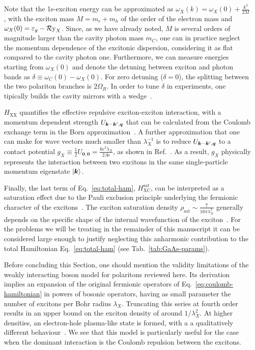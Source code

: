 Note that the 1s-exciton energy can be approximated as
$\omega_X(k) = \omega_X(0) + \frac{k^2}{2M}$, with the exciton mass
$M = m_e + m_h$ of the order of the electron mass and
$\omega_X(0) = \varepsilon_g - \operatorname{\mathcal{R}y}_X$. Since, as we have already
noted, $M$ is several orders of magnitude larger than the cavity
photon mass $m_{C}$, one can in practice neglect the momentum
dependence of the excitonic dispersion, considering it as flat
compared to the cavity photon one. Furthermore, we can measure
energies starting from $\omega_X(0)$ and denote the detuning between
exciton and photon bands as $\delta \equiv \omega_C(0) -
\omega_X(0)$. For zero detuning ($\delta = 0$), the splitting between
the two polariton branches is $2\Omega_R$. In order to tune $\delta$
in experiments, one tipically builds the cavity mirrors with a
wedge~\cite{Weisbuch1992}.



$H_{\text{XX}}$ quantifies the effective repulsive exciton-exciton
interaction, with a momentum dependent strength
$U_{\bm{k} - \bm{k}^{\prime},\bm{q}}$ that can be calculated from the
Coulomb exchange term in the Born approximation~\cite{Ciuti1998}.  A
further approximation that one can make for wave vectors much smaller
than $\lambda_X^{-1}$ is to reduce $U_{\bm{k} - \bm{k}^{\prime},\bm{q}}$ to
a contact potential
$g_X \equiv \frac{1}{2} U_{\bm{0},\bm{0}} =
\frac{6e^2\lambda_X}{2A\epsilon}$, as shown in
Ref.~\cite{Ciuti1998}. As a result, $g_X$ physically represents the
interaction between two excitons in the same single-particle momentum
eigenstate $\vert \bm{k} \rangle$.

Finally, the last term of Eq.~\eqref{eq:total-ham},
$H_{\text{XC}}^{\text{sat}}$, can be interpreted as a saturation
effect due to the Pauli exclusion principle underlying the fermionic
character of the excitons~\cite{Tassone1999}. The exciton saturation
density $\rho_{\text{sat}} \sim \frac{7}{16\pi\lambda_X^2}$ generally
depends on the specific shape of the internal wavefunction of the
exciton~\cite{Glazov2009}.  For the problems we will be treating in
the remainder of this manuscript it can be considered large enough to
justify neglecting this anharmonic contribution to the total
Hamiltonian Eq.~\eqref{eq:total-ham} (see Tab.~\ref{tab:GaAs-params}).

Before concluding this Section, one should mention the validity
limitations of the weakly interacting boson model for polaritons
reviewed here. Its derivation implies an expansion of the original
fermionic operators of Eq.~\eqref{eq:coulomb-hamiltonian} in powers of
bosonic operators, having as small parameter the number of excitons
per Bohr radius $\lambda_X$. Truncating this series at fourth order
results in an upper bound on the exciton density of around
$1/\lambda_X^2$. At higher densities, an electron-hole plasma-like
state is formed, with a a qualitatively different
behaviour~\cite{COMBESCOT2008}.  We see that this model is
particularly useful for the case when the dominant interaction is the
Coulomb repulsion between the excitons.

